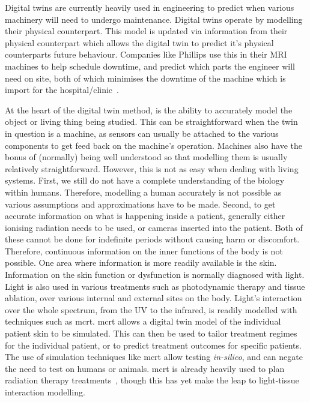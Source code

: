 \noindent Digital twins are currently heavily used in engineering to predict when various machinery will need to undergo maintenance.
Digital twins operate by modelling their physical counterpart.
This model is updated via information from their physical counterpart which allows the digital twin to predict it's physical counterparts future behaviour.
Companies like Phillips use this in their MRI machines to help schedule downtime, and predict which parts the engineer will need on site, both of which minimises the downtime of the machine which is import for the hospital/clinic~\cite{henkvanhouten2018}.

At the heart of the digital twin method, is the ability to accurately model the object or living thing being studied.
This can be straightforward when the twin in question is a machine, as sensors can usually be attached to the various components to get feed back on the machine's operation.
Machines also have the bonus of (normally) being well understood so that modelling them is usually relatively straightforward.
However, this is not as easy when dealing with living systems.
First, we still do not have a complete understanding of the biology within humans.
Therefore, modelling a human accurately is not possible as various assumptions and approximations have to be made.
Second, to get accurate information on what is happening inside a patient, generally either ionising radiation needs to be used, or cameras inserted into the patient.
Both of these cannot be done for indefinite periods without causing harm or discomfort.
Therefore, continuous information on the inner functions of the body is not possible.
One area where information is more readily available is the skin.
Information on the skin function or dysfunction is normally diagnosed with light.
Light is also used in various treatments such as photodynamic therapy and tissue ablation, over various internal and external sites on the body.
Light's interaction over the whole spectrum, from the UV to the infrared, is readily modelled with techniques such as \gls*{mcrt}.
\Gls*{mcrt} allows a digital twin model of the individual patient skin to be simulated.
This can then be used to tailor treatment regimes for the individual patient, or to predict treatment outcomes for specific patients.
The use of simulation techniques like \gls*{mcrt} allow testing \textit{in-silico}, and can negate the need to test on humans or animals.
\Gls*{mcrt} is already heavily used to plan radiation therapy treatments~\cite{andreo2018monte,andreo1991monte}, though this has yet make the leap to light-tissue interaction modelling.


